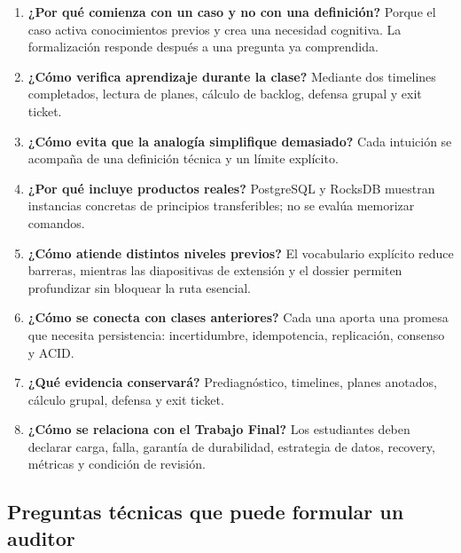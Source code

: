 \documentclass[variant=docente,cover=institutional,mode=screen]{ua-engineering-v6-article}
\begin{document}
\begin{enumerate}
\item \textbf{¿Por qué comienza con un caso y no con una definición?} Porque el caso activa conocimientos previos y crea una necesidad cognitiva. La formalización responde después a una pregunta ya comprendida.

\item \textbf{¿Cómo verifica aprendizaje durante la clase?} Mediante dos timelines completados, lectura de planes, cálculo de backlog, defensa grupal y exit ticket.

\item \textbf{¿Cómo evita que la analogía simplifique demasiado?} Cada intuición se acompaña de una definición técnica y un límite explícito.

\item \textbf{¿Por qué incluye productos reales?} PostgreSQL y RocksDB muestran instancias concretas de principios transferibles; no se evalúa memorizar comandos.

\item \textbf{¿Cómo atiende distintos niveles previos?} El vocabulario explícito reduce barreras, mientras las diapositivas de extensión y el dossier permiten profundizar sin bloquear la ruta esencial.

\item \textbf{¿Cómo se conecta con clases anteriores?} Cada una aporta una promesa que necesita persistencia: incertidumbre, idempotencia, replicación, consenso y ACID.

\item \textbf{¿Qué evidencia conservará?} Prediagnóstico, timelines, planes anotados, cálculo grupal, defensa y exit ticket.

\item \textbf{¿Cómo se relaciona con el Trabajo Final?} Los estudiantes deben declarar carga, falla, garantía de durabilidad, estrategia de datos, recovery, métricas y condición de revisión.
\end{enumerate}

\subsection{Preguntas técnicas que puede formular un auditor}
\end{document}
